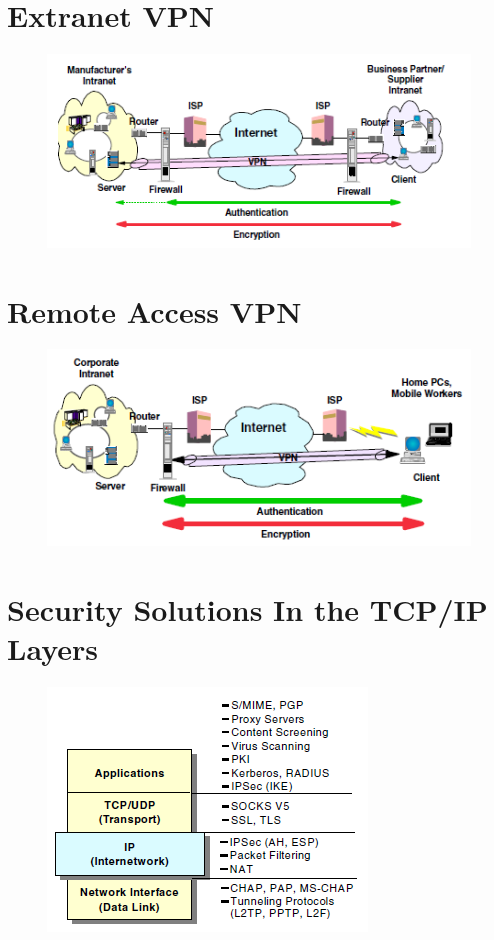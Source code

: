 \documentclass[10pt,a4paper]{article}
\begin{document}
\newpage
\section{Extranet VPN}

\begin{figure}[hbtp]
\centering
\includegraphics[scale=1]{Extranet-VPN.png}
\end{figure}

\newpage
\section{Remote Access VPN}

\begin{figure}[hbtp]
\centering
\includegraphics[scale=1]{Remote Access VPN.png}
\end{figure}

\newpage
\section{Security Solutions In the TCP/IP Layers}

\begin{figure}[hbtp]
\includegraphics[scale=1]{Security Solutions In the TCP IP Layers.png}
\end{figure}
\end{document}
